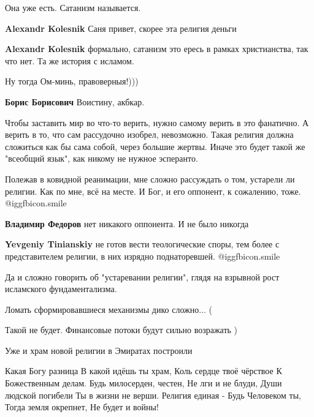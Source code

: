 \begin{itemize} %
Она уже есть. Сатанизм называется.

\begin{itemize} %
\textbf{Alexandr Kolesnik} Саня привет, скорее эта религия деньги

\textbf{Alexandr Kolesnik} формально, сатанизм это ересь в рамках христианства, так что нет.
Та же история с исламом.
\end{itemize} %

Ну тогда Ом-минь, правоверныя!)))

\textbf{Борис Борисович}
Воистину, акбкар.

Чтобы заставить мир во что-то верить, нужно самому верить в это фанатично. А верить в то, что сам рассудочно изобрел, невозможно.
Такая религия должна сложиться как бы сама собой, через большие жертвы. Иначе это будет такой же "всеобщий язык", как никому не нужное эсперанто.


Полежав в ковидной реанимации, мне сложно рассуждать о том, устарели ли
религии. Как по мне, всё на месте. И Бог, и его оппонент, к сожалению, тоже.  @igg{fbicon.smile} 

\begin{itemize} %
\textbf{Владимир Федоров} нет никакого оппонента. И не было никогда

\textbf{Yevgeniy Tinianskiy} не готов вести теологические споры, тем более с представителем религии, в них изрядно поднаторевшей.  @igg{fbicon.smile} 
\end{itemize} %

Да и сложно говорить об "устаревании религии", глядя на взрывной рост исламского фундаментализма.

Ломать сформировавшиеся механизмы дико сложно... (

Такой не будет.
Финансовые потоки будут сильно возражать )

Уже и храм новой религии в Эмиратах построили


\obeycr
Какая Богу разница
В какой идёшь ты храм,
Коль сердце твоё чёрствое
К Божественным делам.
Будь милосерден, честен,
Не лги и не блуди,
Души людской погибели
Ты в жизни не верши.
Религия единая -
Будь Человеком ты,
Тогда земля окрепнет,
Не будет и войны!
\restorecr


\end{itemize}
